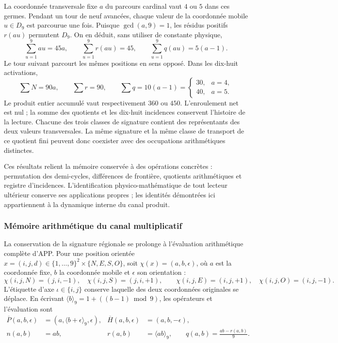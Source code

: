 La coordonnée transversale fixe $a$ du parcours cardinal vaut $4$ ou
$5$ dans ces germes. Pendant un tour de neuf avancées, chaque
valeur de la coordonnée mobile $u\in D_9$ est parcourue une fois. Puisque
$\gcd(a,9)=1$, les résidus positifs $r(au)$ permutent $D_9$.
On en déduit, sans utiliser de constante physique,
\[
 \sum_{u=1}^9au=45a,\qquad
 \sum_{u=1}^9r(au)=45,\qquad
 \sum_{u=1}^9q(au)=5(a-1).
\]
Le tour suivant parcourt les mêmes positions en sens opposé.
Dans les dix-huit activations,
\begin{equation}
 \sum N=90a,\qquad\sum r=90,\qquad
 \sum q=10(a-1)=
 \begin{cases}30,&a=4,\\40,&a=5.\end{cases}
 \label{ii:bim09:ocupacion-30-40}
\end{equation}
Le produit entier accumulé vaut respectivement $360$ ou $450$.
L'enroulement net est nul ; la somme des quotients et les dix-huit
incidences conservent l'histoire de la lecture. Chacune des trois
classes de signature contient des représentants des deux valeurs transversales.
La même signature et la même classe de transport de ce quotient fini
peuvent donc coexister avec des occupations arithmétiques distinctes.

Ces résultats relient la mémoire conservée à des opérations
concrètes : permutation des demi-cycles, différences de frontière,
quotients arithmétiques et registre d'incidences. L'identification
physico-mathématique de tout lecteur ultérieur conserve ses applications
propres ; les identités démontrées ici appartiennent à la dynamique
interne du canal produit.



\subsubsection{Mémoire arithmétique du canal multiplicatif}
\label{ii:prd-arit:seccion}

La conservation de la signature régionale se prolonge à l'évaluation
arithmétique complète d'APP. Pour une position orientée
\(x=(i,j,d)\in\{1,\ldots,9\}^2\times\{N,E,S,O\}\), soit
\(\chi(x)=(a,b,\epsilon)\), où \(a\) est la coordonnée fixe,
\(b\) la coordonnée mobile et \(\epsilon\) son orientation :
\[
 \chi(i,j,N)=(j,i,-1),\quad \chi(i,j,S)=(j,i,+1),\qquad
 \chi(i,j,E)=(i,j,+1),\quad \chi(i,j,O)=(i,j,-1).
\]
L'étiquette d'axe \(\iota\in\{i,j\}\) conserve laquelle des
deux coordonnées originales se déplace. En écrivant
\(\langle b\rangle_9=1+((b-1)\bmod9)\), les opérateurs et
l'évaluation sont
\begin{align}
 \overline P(a,b,\epsilon)&=(a,\langle b+\epsilon\rangle_9,\epsilon),
 &\overline H(a,b,\epsilon)&=(a,b,-\epsilon),\label{ii:prd-arit:PH}\\
 n(a,b)&=ab,&r(a,b)&=\langle ab\rangle_9,\qquad
 q(a,b)=\frac{ab-r(a,b)}9.\label{ii:prd-arit:rq}
\end{align}

